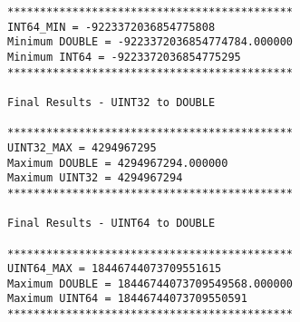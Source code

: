\begin{verbatim}
********************************************
INT64_MIN = -9223372036854775808
Minimum DOUBLE = -9223372036854774784.000000
Minimum INT64 = -9223372036854775295
********************************************

Final Results - UINT32 to DOUBLE

********************************************
UINT32_MAX = 4294967295
Maximum DOUBLE = 4294967294.000000
Maximum UINT32 = 4294967294
********************************************

Final Results - UINT64 to DOUBLE

********************************************
UINT64_MAX = 18446744073709551615
Maximum DOUBLE = 18446744073709549568.000000
Maximum UINT64 = 18446744073709550591
********************************************

\end{verbatim}
